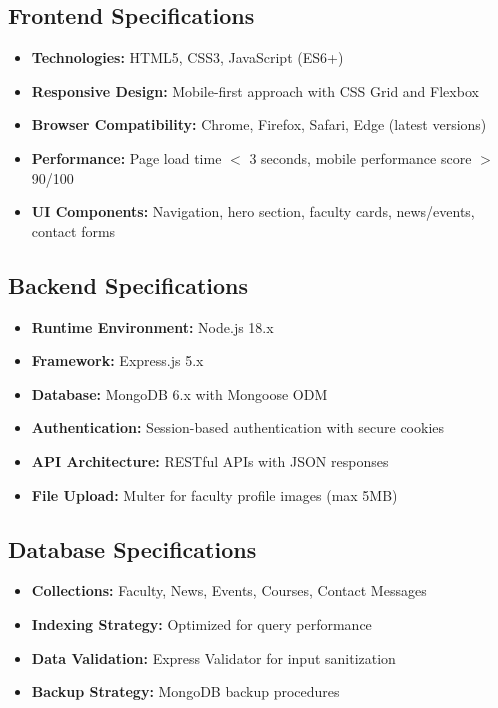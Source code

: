 \documentclass[12pt,a4paper]{report}
\begin{document}
\subsection{Frontend Specifications}
\begin{itemize}
    \item \textbf{Technologies:} HTML5, CSS3, JavaScript (ES6+)
    \item \textbf{Responsive Design:} Mobile-first approach with CSS Grid and Flexbox
    \item \textbf{Browser Compatibility:} Chrome, Firefox, Safari, Edge (latest versions)
    \item \textbf{Performance:} Page load time $<$ 3 seconds, mobile performance score $>$ 90/100
    \item \textbf{UI Components:} Navigation, hero section, faculty cards, news/events, contact forms
\end{itemize}

\subsection{Backend Specifications}
\begin{itemize}
    \item \textbf{Runtime Environment:} Node.js 18.x
    \item \textbf{Framework:} Express.js 5.x
    \item \textbf{Database:} MongoDB 6.x with Mongoose ODM
    \item \textbf{Authentication:} Session-based authentication with secure cookies
    \item \textbf{API Architecture:} RESTful APIs with JSON responses
    \item \textbf{File Upload:} Multer for faculty profile images (max 5MB)
\end{itemize}

\subsection{Database Specifications}
\begin{itemize}
    \item \textbf{Collections:} Faculty, News, Events, Courses, Contact Messages
    \item \textbf{Indexing Strategy:} Optimized for query performance
    \item \textbf{Data Validation:} Express Validator for input sanitization
    \item \textbf{Backup Strategy:} MongoDB backup procedures
\end{itemize}
\end{document}
